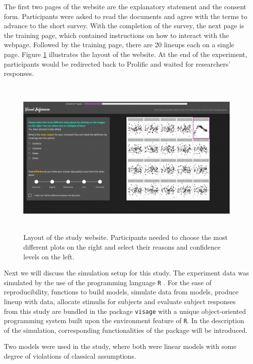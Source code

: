 \documentclass{monashthesis}
\theoremstyle{definition}
\theoremstyle{definition}
\theoremstyle{definition}
\theoremstyle{definition}
\theoremstyle{remark}
\begin{document}
The first two pages of the website are the explanatory statement and the consent form. Participants were asked to read the documents and agree with the terms to advance to the short survey. With the completion of the survey, the next page is the training page, which contained instructions on how to interact with the webpage. Followed by the training page, there are 20 lineups each on a single page. Figure \ref{fig:website-layout} illustrates the layout of the website. At the end of the experiment, participants would be redirected back to Prolific and waited for researchers' responses.

\begin{figure}
\centering
\includegraphics[width=5.72917in,height=3.11458in]{figures/website.png}
\caption{Layout of the study website. Participants needed to choose the most different plots on the right and select their reasons and confidence levels on the left. \label{fig:website-layout}}
\end{figure}

Next we will discuss the simulation setup for this study. The experiment data was simulated by the use of the programming language \texttt{R} \autocite{r_core_team_r_2021}. For the ease of reproducibility, functions to build models, simulate data from models, produce lineup with data, allocate stimulis for subjects and evaluate subject responses from this study are bundled in the package \texttt{visage} with a unique object-oriented programming system built upon the environment feature of \texttt{R}. In the description of the simulation, corresponding functionalities of the package will be introduced.

Two models were used in the study, where both were linear models with some degree of violations of classical assumptions.
\end{document}
